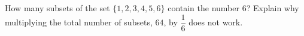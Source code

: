 How many subsets of the set $\{1,2,3,4,5,6\}$ contain the number $6$? Explain why multiplying the total number of subsets, $64$, by $\dfrac16$ does not work.

